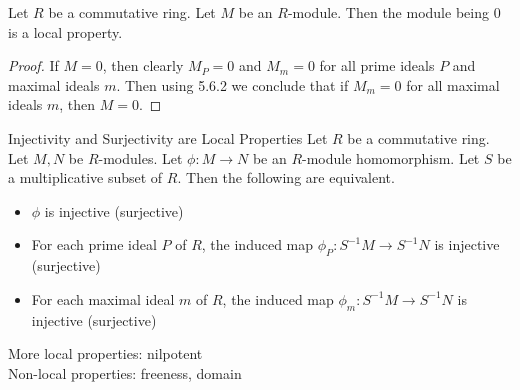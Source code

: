 \documentclass[a4paper]{article}
\begin{document}
\begin{lmm}{}{} Let $R$ be a commutative ring. Let $M$ be an $R$-module. Then the module being $0$ is a local property. 
\begin{proof}
If $M=0$, then clearly $M_P=0$ and $M_m=0$ for all prime ideals $P$ and maximal ideals $m$. Then using 5.6.2 we conclude that if $M_m=0$ for all maximal ideals $m$, then $M=0$. 
\end{proof}
\end{lmm}

\begin{prp}{Injectivity and Surjectivity are Local Properties}{} Let $R$ be a commutative ring. Let $M,N$ be $R$-modules. Let $\phi:M\to N$ be an $R$-module homomorphism. Let $S$ be a multiplicative subset of $R$. Then the following are equivalent. 
\begin{itemize}
\item $\phi$ is injective (surjective)
\item For each prime ideal $P$ of $R$, the induced map $\phi_P:S^{-1}M\to S^{-1}N$ is injective (surjective)
\item For each maximal ideal $m$ of $R$, the induced map $\phi_m:S^{-1}M\to S^{-1}N$ is injective (surjective)
\end{itemize}
\end{prp}

More local properties: nilpotent\\
Non-local properties: freeness, domain
\end{document}
